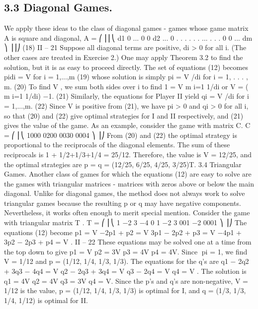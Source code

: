\subsection{3.3 Diagonal Games.} We apply these ideas to the class of diagonal games - games
whose game matrix A is square and diagonal,
A =
⎛
⎜⎜⎝
d1 0 ... 0
0 d2 ... 0 .
.
. .
.
. ... .
.
.
0 0 ... dm
⎞
⎟⎟⎠
(18)
II – 21
Suppose all diagonal terms are positive, di > 0 for all i. (The other cases are treated in
Exercise 2.) One may apply Theorem 3.2 to find the solution, but it is as easy to proceed
directly. The set of equations (12) becomes
pidi = V for i = 1,...,m (19)
whose solution is simply
pi = V /di for i = 1, . . . , m. (20)
To find V , we sum both sides over i to find
1 = V 
m
i=1
1/di or V = (
m
i=1
1/di)
−1. (21)
Similarly, the equations for Player II yield
qi = V /di for i = 1,...,m. (22)
Since V is positive from (21), we have pi > 0 and qi > 0 for all i, so that (20) and (22)
give optimal strategies for I and II respectively, and (21) gives the value of the game.
As an example, consider the game with matrix C.
C =
⎛
⎜⎝
1000
0200
0030
0004
⎞
⎟⎠
From (20) and (22) the optimal strategy is proportional to the reciprocals of the diagonal
elements. The sum of these reciprocals is 1 + 1/2+1/3+1/4 = 25/12. Therefore, the
value is V = 12/25, and the optimal strategies are p = q = (12/25, 6/25, 4/25, 3/25)T.
3.4 Triangular Games. Another class of games for which the equations (12) are
easy to solve are the games with triangular matrices - matrices with zeros above or below
the main diagonal. Unlike for diagonal games, the method does not always work to solve
triangular games because the resulting p or q may have negative components. Nevertheless,
it works often enough to merit special mention. Consider the game with triangular matrix
T .
T =
⎛
⎜⎝
1 −2 3 −4
0 1 −2 3
001 −2
0001
⎞
⎟⎠
The equations (12) become
p1 = V
−2p1 + p2 = V
3p1 − 2p2 + p3 = V
−4p1 + 3p2 − 2p3 + p4 = V .
II – 22
These equations may be solved one at a time from the top down to give
p1 = V p2 = 3V p3 = 4V p4 = 4V.
Since pi = 1, we find V = 1/12 and p = (1/12, 1/4, 1/3, 1/3). The equations for the q’s
are
q1 − 2q2 + 3q3 − 4q4 = V
q2 − 2q3 + 3q4 = V
q3 − 2q4 = V
q4 = V .
The solution is
q1 = 4V q2 = 4V q3 = 3V q4 = V.
Since the p’s and q’s are non-negative, V = 1/12 is the value, p = (1/12, 1/4, 1/3, 1/3) is
optimal for I, and q = (1/3, 1/3, 1/4, 1/12) is optimal for II.
